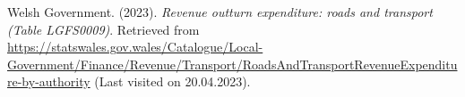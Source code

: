 \documentclass[
  12pt,
]{article}
\newlength{\cslhangindent}
\newlength{\cslentryspacingunit} %
\newenvironment{CSLReferences}[2] %
 {%
  \setlength{\parindent}{0pt}
  \ifodd #1
  \let\oldpar\par
  \def\par{\hangindent=\cslhangindent\oldpar}
  \fi
  \setlength{\parskip}{#2\cslentryspacingunit}
 }%
 {}
\begin{document}
\begin{CSLReferences}{1}{0}
\leavevmode{}%
Welsh Government. (2023). \emph{{Revenue outturn expenditure: roads and transport (Table LGFS0009)}}. Retrieved from \url{https://statswales.gov.wales/Catalogue/Local-Government/Finance/Revenue/Transport/RoadsAndTransportRevenueExpenditure-by-authority} (Last visited on 20.04.2023).

\end{CSLReferences}
\end{document}
